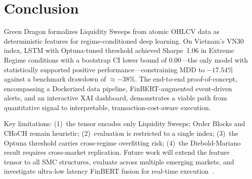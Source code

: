 \documentclass[runningheads]{llncs}
\begin{document}
\section{Conclusion}

Green Dragon formalizes Liquidity Sweeps from atomic OHLCV data as deterministic features for regime-conditioned deep learning. On Vietnam's VN30 index, LSTM with Optuna-tuned threshold achieved Sharpe~1.06 in Extreme Regime conditions with a bootstrap CI lower bound of 0.00---the only model with statistically supported positive performance---constraining MDD to $-17.54\%$ against a benchmark drawdown of ${\approx}{-38\%}$. The end-to-end proof-of-concept, encompassing a Dockerized data pipeline, FinBERT-augmented event-driven alerts, and an interactive XAI dashboard, demonstrates a viable path from quantitative signal to interpretable, transaction-cost-aware execution.

Key limitations: (1)~the tensor encodes only Liquidity Sweeps; Order Blocks and CHoCH remain heuristic; (2)~evaluation is restricted to a single index; (3)~the Optuna threshold carries cross-regime overfitting risk; (4)~the Diebold-Mariano result requires cross-market replication. Future work will extend the feature tensor to all SMC structures, evaluate across multiple emerging markets, and investigate ultra-low latency FinBERT fusion for real-time execution~\cite{tetlock2007}.
\end{document}
